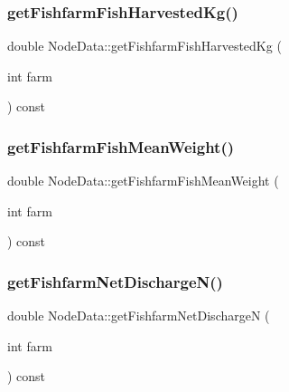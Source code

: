 \subsubsection{\texorpdfstring{getFishfarmFishHarvestedKg()}{getFishfarmFishHarvestedKg()}}
{\footnotesize\ttfamily double Node\+Data\+::get\+Fishfarm\+Fish\+Harvested\+Kg (\begin{DoxyParamCaption}\item[{int}]{farm }\end{DoxyParamCaption}) const\hspace{0.3cm}{\ttfamily [inline]}}

\mbox{\label{class_node_data_a9d3fa7a18dde95e27f5bdb30cbb6d5b4}} 
\subsubsection{\texorpdfstring{getFishfarmFishMeanWeight()}{getFishfarmFishMeanWeight()}}
{\footnotesize\ttfamily double Node\+Data\+::get\+Fishfarm\+Fish\+Mean\+Weight (\begin{DoxyParamCaption}\item[{int}]{farm }\end{DoxyParamCaption}) const\hspace{0.3cm}{\ttfamily [inline]}}

\mbox{\label{class_node_data_af488cc8bc5898aba67e3151de55b96f8}} 
\subsubsection{\texorpdfstring{getFishfarmNetDischargeN()}{getFishfarmNetDischargeN()}}
{\footnotesize\ttfamily double Node\+Data\+::get\+Fishfarm\+Net\+DischargeN (\begin{DoxyParamCaption}\item[{int}]{farm }\end{DoxyParamCaption}) const\hspace{0.3cm}{\ttfamily [inline]}}

\mbox{\label{class_node_data_a8279b49def32d5fb15cd2c641367232a}} 
